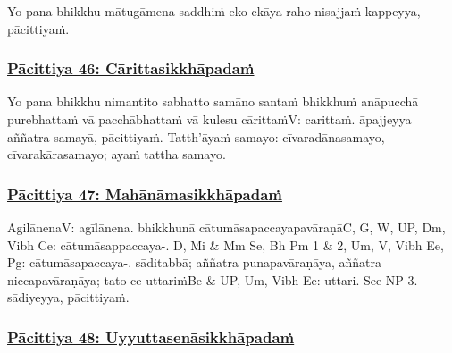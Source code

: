 Yo pana bhikkhu mātugāmena saddhiṁ eko ekāya raho nisajjaṁ kappeyya, pācittiyaṁ.



\subsubsection*{\hyperref[exp46]{Pācittiya 46: Cārittasikkhāpadaṁ}}
\label{pac46}

Yo pana bhikkhu nimantito sabhatto samāno santaṁ bhikkhuṁ anāpucchā purebhattaṁ vā pacchābhattaṁ vā kulesu cārittaṁ\makeatletter\hyperlink{endnote-appendix}\makeatother V: carittaṁ. āpajjeyya aññatra samayā, pācittiyaṁ. Tatth'āyaṁ samayo: cīvaradānasamayo, cīvarakārasamayo; ayaṁ tattha samayo.



\subsubsection*{\hyperref[exp47]{Pācittiya 47: Mahānāmasikkhāpadaṁ}}
\label{pac47}

Agilānena\makeatletter\hyperlink{endnote-appendix}\makeatother  V: agīlānena. bhikkhunā cātumāsapaccayapavāraṇā\makeatletter\hyperlink{endnote-appendix}\makeatother C, G, W, UP, Dm, Vibh Ce: cātumāsappaccaya-. D, Mi & Mm Se, Bh Pm 1 & 2, Um, V, Vibh Ee, Pg: cātumāsapaccaya-. sāditabbā; aññatra punapavāraṇāya, aññatra niccapavāraṇāya; tato ce uttariṁ\makeatletter\hyperlink{endnote-appendix}\makeatother Be & UP, Um, Vibh Ee: uttari. See NP 3. sādiyeyya, pācittiyaṁ.



\subsubsection*{\hyperref[exp48]{Pācittiya 48: Uyyuttasenāsikkhāpadaṁ}}
\label{pac48}


